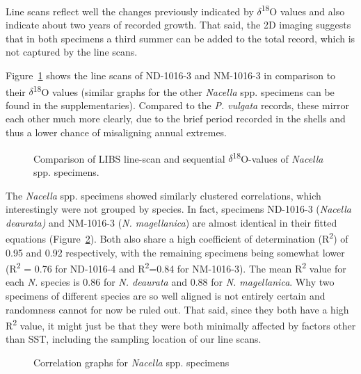 \documentclass[
  authoryear,
  preprint,
  3p]{elsarticle}
\begin{document}
Line scans reflect well the changes previously indicated by
\(\delta\)\textsuperscript{18}O values and also indicate about two years
of recorded growth. That said, the 2D imaging suggests that in both
specimens a third summer can be added to the total record, which is not
captured by the line scans.

Figure~\ref{fig-Nac_Comp} shows the line scans of ND-1016-3 and
NM-1016-3 in comparison to their \(\delta\)\textsuperscript{18}O values
(similar graphs for the other \emph{Nacella} spp. specimens can be found
in the supplementaries). Compared to the \emph{P. vulgata} records,
these mirror each other much more clearly, due to the brief period
recorded in the shells and thus a lower chance of misaligning annual
extremes.

\begin{figure}


\caption{\label{fig-Nac_Comp}Comparison of LIBS line-scan and sequential
\(\delta\)\textsuperscript{18}O-values of \emph{Nacella} spp.
specimens.}

\end{figure}%

The \emph{Nacella} spp. specimens showed similarly clustered
correlations, which interestingly were not grouped by species. In fact,
specimens ND-1016-3 (\emph{Nacella deaurata)} and NM-1016-3 (\emph{N.
magellanica}) are almost identical in their fitted equations
(Figure~\ref{fig-Nac_Corr}). Both also share a high coefficient of
determination (R\textsuperscript{2}) of 0.95 and 0.92 respectively, with
the remaining specimens being somewhat lower (R\textsuperscript{2} =
0.76 for ND-1016-4 and R\textsuperscript{2}=0.84 for NM-1016-3). The
mean R\textsuperscript{2} value for each \emph{N.} species is 0.86 for
\emph{N. deaurata} and 0.88 for \emph{N. magellanica}. Why two specimens
of different species are so well aligned is not entirely certain and
randomness cannot for now be ruled out. That said, since they both have
a high R\textsuperscript{2} value, it might just be that they were both
minimally affected by factors other than SST, including the sampling
location of our line scans.

\begin{figure}


\caption{\label{fig-Nac_Corr}Correlation graphs for \emph{Nacella} spp.
specimens}

\end{figure}%
\end{document}
